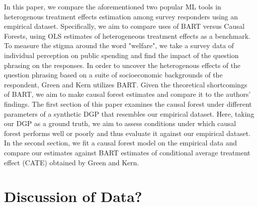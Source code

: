 \documentclass[12pt]{article}
\begin{document}
In this paper, we compare the aforementioned two popular ML tools in heterogenous treatment effects estimation among survey responders using an empirical dataset. Specifically, we aim to compare uses of BART versus Causal Forests, using OLS estimates of heterogeneous treatment effects as a benchmark. 
To measure the stigma around the word "welfare", we take a survey data of individual perception on public spending and find the impact of the question phrasing on the responses. In order to uncover the heterogenous effects of the question phrasing based on a suite of socioeconomic backgrounds of the respondent, Green and Kern utilizes BART. Given the theoretical shortcomings of BART, we aim to make causal forest estimates and compare it to the authors' findings. The first section of this paper examines the causal forest under different parameters of a synthetic DGP that resembles our empirical dataset. Here, taking our DGP as a ground truth, we aim to assess conditions under which causal forest performs well or poorly and thus evaluate it against our empirical dataset. In the second section, we fit a causal forest model on the empirical data and compare our estimates against BART estimates of conditional average treatment effect (CATE) obtained by Green and Kern. \\


\section{Discussion of Data?} 


\newpage


\end{document}

